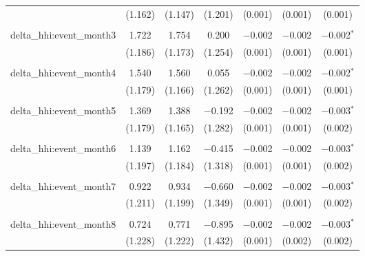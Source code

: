 \begin{table}[H]
{\begin{tabular}{@{\extracolsep{5pt}}lcccccc}
   & (1.162) & (1.147) & (1.201) & (0.001) & (0.001) & (0.001) \\  

   & & & & & & \\  

  delta\_hhi:event\_month3 & 1.722 & 1.754 & 0.200 & $-$0.002 & $-$0.002 & $-$0.002$^{*}$ \\  

   & (1.186) & (1.173) & (1.254) & (0.001) & (0.001) & (0.001) \\  

   & & & & & & \\  

  delta\_hhi:event\_month4 & 1.540 & 1.560 & 0.055 & $-$0.002 & $-$0.002 & $-$0.002$^{*}$ \\  

   & (1.179) & (1.166) & (1.262) & (0.001) & (0.001) & (0.001) \\  

   & & & & & & \\  

  delta\_hhi:event\_month5 & 1.369 & 1.388 & $-$0.192 & $-$0.002 & $-$0.002 & $-$0.003$^{*}$ \\  

   & (1.179) & (1.165) & (1.282) & (0.001) & (0.001) & (0.002) \\  

   & & & & & & \\  

  delta\_hhi:event\_month6 & 1.139 & 1.162 & $-$0.415 & $-$0.002 & $-$0.002 & $-$0.003$^{*}$ \\  

   & (1.197) & (1.184) & (1.318) & (0.001) & (0.001) & (0.002) \\  

   & & & & & & \\  

  delta\_hhi:event\_month7 & 0.922 & 0.934 & $-$0.660 & $-$0.002 & $-$0.002 & $-$0.003$^{*}$ \\  

   & (1.211) & (1.199) & (1.349) & (0.001) & (0.001) & (0.002) \\  

   & & & & & & \\  

  delta\_hhi:event\_month8 & 0.724 & 0.771 & $-$0.895 & $-$0.002 & $-$0.002 & $-$0.003$^{*}$ \\  

   & (1.228) & (1.222) & (1.432) & (0.001) & (0.002) & (0.002) \\  


\end{tabular}}
\end{table}
